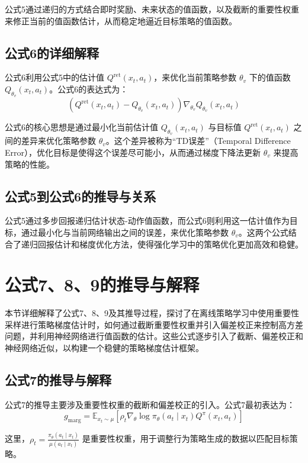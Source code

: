 \documentclass[twocolumn, 10pt]{article} %
\theoremstyle{remark}
\begin{document}
公式5通过递归的方式结合即时奖励、未来状态的值函数，以及截断的重要性权重来修正当前的值函数估计，从而稳定地逼近目标策略的值函数。

\subsection{公式6的详细解释}

公式6利用公式5中的估计值 \( Q^{\text{ret}}(x_t, a_t) \)，来优化当前策略参数 \(\theta_v\) 下的值函数 \( Q_{\theta_v}(x_t, a_t) \)。公式6的表达式为：
\[
(Q^{\text{ret}}(x_t, a_t) - Q_{\theta_v}(x_t, a_t))\nabla_{\theta_v} Q_{\theta_v}(x_t, a_t)
\]

公式6的核心思想是通过最小化当前估计值 \( Q_{\theta_v}(x_t, a_t) \) 与目标值 \( Q^{\text{ret}}(x_t, a_t) \) 之间的差异来优化策略参数 \(\theta_v\)。这个差异被称为“TD误差”（Temporal Difference Error），优化目标是使得这个误差尽可能小，从而通过梯度下降法更新 \(\theta_v\) 来提高策略的性能。

\subsection{公式5到公式6的推导与关系}

公式5通过多步回报递归估计状态-动作值函数，而公式6则利用这一估计值作为目标，通过最小化与当前网络输出之间的误差，来优化策略参数 \(\theta_v\)。这两个公式结合了递归回报估计和梯度优化方法，使得强化学习中的策略优化更加高效和稳健。


\section{公式7、8、9的推导与解释}

本节详细解释了公式7、8、9及其推导过程，探讨了在离线策略学习中使用重要性采样进行策略梯度估计时，如何通过截断重要性权重并引入偏差校正来控制高方差问题，并利用神经网络进行值函数的估计。这些公式逐步引入了截断、偏差校正和神经网络近似，以构建一个稳健的策略梯度估计框架。

\subsection{公式7的推导与解释}

公式7的推导主要涉及重要性权重的截断和偏差校正的引入。公式7最初表达为：
\[
g_{\text{marg}} = \mathbb{E}_{x_t \sim \mu} \left[ \rho_t \nabla_\theta \log \pi_\theta(a_t \mid x_t) Q^\pi(x_t, a_t) \right]
\]

这里，\(\rho_t = \frac{\pi_\theta(a_t \mid x_t)}{\mu(a_t \mid x_t)}\) 是重要性权重，用于调整行为策略生成的数据以匹配目标策略。
\end{document}
